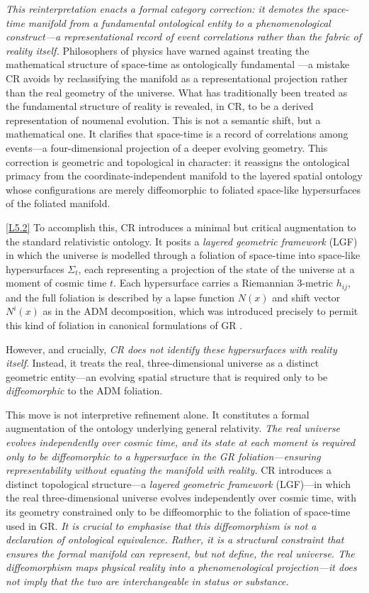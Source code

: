 \documentclass[12pt]{book}
\newcounter{logicanchor}
\newenvironment{logicanchorenv}[1]{\refstepcounter{logicanchor}\label{#1}}{}
\newcommand{\logiclink}[2]{\begin{logicanchorenv}{logic:#1}\end{logicanchorenv}\hyperref[appendix:#1]{[#1]}\xspace}
\begin{document}
\textit{This reinterpretation enacts a formal category correction: it demotes the space-time manifold from a fundamental ontological entity to a phenomenological construct---a representational record of event correlations rather than the fabric of reality itself.} Philosophers of physics have warned against treating the mathematical structure of space-time as ontologically fundamental \citep[see esp.~on representational fidelity and model ontology]{Rickles2008}---a mistake CR avoids by reclassifying the manifold as a representational projection rather than the real geometry of the universe. What has traditionally been treated as the fundamental structure of reality is revealed, in CR, to be a derived representation of noumenal evolution. This is not a semantic shift, but a mathematical one. It clarifies that space-time is a record of correlations among events---a four-dimensional projection of a deeper evolving geometry. This correction is geometric and topological in character: it reassigns the ontological primacy from the coordinate-independent manifold to the layered spatial ontology whose configurations are merely diffeomorphic to foliated space-like hypersurfaces of the foliated manifold.

\logiclink{L5.2}{} To accomplish this, CR introduces a minimal but critical augmentation to the standard relativistic ontology. It posits a \textit{layered geometric framework} (LGF) in which the universe is modelled through a foliation of space-time into space-like hypersurfaces $\Sigma_t$, each representing a projection of the state of the universe at a moment of cosmic time $t$. Each hypersurface carries a Riemannian 3-metric $h_{ij}$, and the full foliation is described by a lapse function $N(x)$ and shift vector $N^i(x)$ as in the ADM decomposition, which was introduced precisely to permit this kind of foliation in canonical formulations of GR \citep{arnowitt1962,arnowitt2008}. 

However, and crucially, \textit{CR does not identify these hypersurfaces with reality itself}. Instead, it treats the real, three-dimensional universe as a distinct geometric entity---an evolving spatial structure that is required only to be \textit{diffeomorphic} to the ADM foliation. 

This move is not interpretive refinement alone. It constitutes a formal augmentation of the ontology underlying general relativity. \textit{The real universe evolves independently over cosmic time, and its state at each moment is required only to be diffeomorphic to a hypersurface in the GR foliation---ensuring representability without equating the manifold with reality.} CR introduces a distinct topological structure---a \textit{layered geometric framework} (LGF)---in which the real three-dimensional universe evolves independently over cosmic time, with its geometry constrained only to be diffeomorphic to the foliation of space-time used in GR. \textit{It is crucial to emphasise that this diffeomorphism is not a declaration of ontological equivalence. Rather, it is a structural constraint that ensures the formal manifold can represent, but not define, the real universe. The diffeomorphism maps physical reality into a phenomenological projection---it does not imply that the two are interchangeable in status or substance.}
\end{document}

